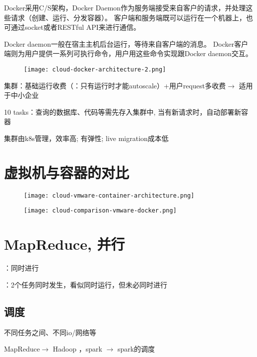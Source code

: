 Docker采用C/S架构，Docker Daemon作为服务端接受来自客户的请求，并处理这些请求（创建、运行、分发容器）。 客户端和服务端既可以运行在一个机器上，也可通过socket或者RESTful API来进行通信。 

Docker daemon一般在宿主主机后台运行，等待来自客户端的消息。 Docker客户端则为用户提供一系列可执行命令，用户用这些命令实现跟Docker daemon交互。 

\begin{figure}[htbp]
    \centering
    \texttt{[image: cloud-docker-architecture-2.png]}
\end{figure}

\begin{definition}[Cluster]

\end{definition}

集群：基础运行收费（：只有运行时才能autoscale）+用户request多收费$\rightarrow$ 适用于中小企业

\begin{example}
    10 tasks：查询的数据库、代码等需先存入️集群中, 
当有新请求时，️自动部署新容器
\end{example}

集群由k8s管理，效率高; 有弹性; live migration成本低

\section{虚拟机与容器的对比}


\begin{figure}[htbp]
    \texttt{[image: cloud-vmware-container-architecture.png]}
\end{figure}

\begin{figure}[htbp]
    \texttt{[image: cloud-comparison-vmware-docker.png]}
\end{figure}

\section{MapReduce, 并行}

：同时进行

：2个任务同时发生，看似同时运行，但未必同时进行

\subsection{调度}

不同任务之间、不同io/网络等

MapReduce$\rightarrow$ Hadoop ，spark $\rightarrow$ spark的调度